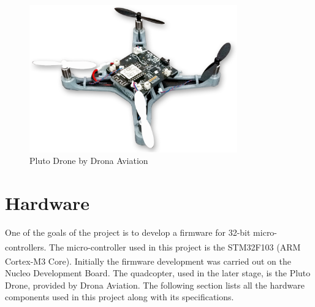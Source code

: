 \documentclass[a4paper,12pt,oneside]{book}
\begin{document}
\begin{figure}[!htb]
\centering
\includegraphics[width=0.8\textwidth]{images/pluto_drone}
\caption{Pluto Drone by Drona Aviation}
\end{figure}


\chapter[Hardware]{Hardware}
One of the goals of the project is to develop a firmware for 32-bit micro-controllers. The micro-controller used in this project is the STM32F103 (ARM\textsuperscript{\textregistered} Cortex\textsuperscript{\textregistered}-M3 Core). Initially the firmware development was carried out on the Nucleo Development Board. The quadcopter, used in the later stage, is the Pluto Drone, provided by Drona Aviation. The following section lists all the hardware components used in this project along with its specifications.
\end{document}
